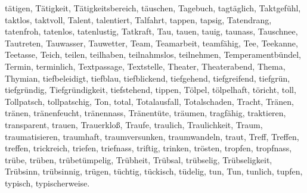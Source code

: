 \documentclass[a4paper,10pt,fleqn,twocolumn,twoside,dvipdfmx]{scrartcl}
\begin{document}
tätigen,
Tätigkeit,
Tätigkeitsbereich,
täuschen,
Tagebuch,
tagtäglich,
Taktgefühl,
taktlos,
taktvoll,
Talent,
talentiert,
Talfahrt,
tappen,
tapsig,
Tatendrang,
tatenfroh,
tatenlos,
tatenlustig,
Tatkraft,
Tau,
tauen,
tauig,
taunass,
Tauschnee,
Tautreten,
Tauwasser,
Tauwetter,
Team,
Teamarbeit,
teamfähig,
Tee,
Teekanne,
Teetasse,
Teich,
teilen,
teilhaben,
teilnahmslos,
teilnehmen,
Temperamentbündel,
Termin,
terminlich,
Textpassage,
Textstelle,
Theater,
Theaterabend,
Thema,
Thymian,
tiefbeleidigt,
tiefblau,
tiefblickend,
tiefgehend,
tiefgreifend,
tiefgrün,
tiefgründig,
Tiefgründigkeit,
tiefstehend,
tippen,
Tölpel,
tölpelhaft,
töricht,
toll,
Tollpatsch,
tollpatschig,
Ton,
total,
Totalausfall,
Totalschaden,
Tracht,
Tränen,
tränen,
tränenfeucht,
tränennass,
Tränentüte,
träumen,
tragfähig,
traktieren,
transparent,
trauen,
Trauerkloß,
Traufe,
traulich,
Traulichkeit,
Traum,
traumatisieren,
traumhaft,
traumversunken,
traumwandeln,
traut,
Treff,
Treffen,
treffen,
trickreich,
triefen,
triefnass,
triftig,
trinken,
trösten,
tropfen,
tropfnass,
trübe,
trüben,
trübetümpelig,
Trübheit,
Trübsal,
trübselig,
Trübseligkeit,
Trübsinn,
trübsinnig,
trügen,
tüchtig,
tückisch,
tüdelig,
tun,
Tun,
tunlich,
tupfen,
typisch,
typischerweise.
\end{document}
